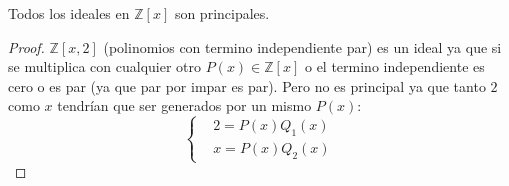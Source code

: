 \begin{ce}
    Todos los ideales en $\mathbb{Z}[x]$ son principales.
\end{ce}

\begin{proof}
    $\mathbb{Z}[x,2]$ (polinomios con termino independiente par) es un ideal ya que si se multiplica con cualquier otro $P(x) \in \mathbb{Z}[x]$ o el termino independiente es cero o es par (ya que par por impar es par). Pero no es principal ya que tanto $2$ como $x$ tendrían que ser generados por un mismo $P(x)$:
    \begin{equation}
        \begin{cases}
            & 2 = P(x)Q_{1}(x)\\
            & x = P(x)Q_{2}(x)
        \end{cases}
    \end{equation}
\end{proof}

